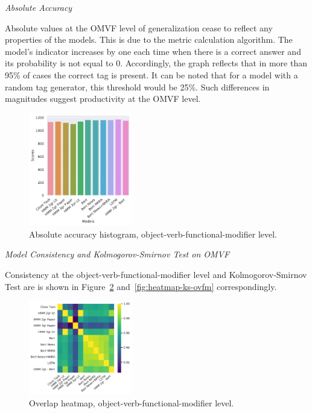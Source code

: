 \documentclass[a4paper]{article}
\newcommand{\head}[1]{\vspace{0.5em}\emph{#1}\vspace{0.25em}}
\begin{document}
\head{Absolute Accuracy}

Absolute values at the OMVF level of generalization cease to reflect
any properties of the models. This is due to the metric calculation
algorithm. The model's indicator increases by one each time when there
is a correct answer and its probability is not equal to 0.
Accordingly, the graph reflects that in more than 95\% of cases the
correct tag is present. It can be noted that for a model with a random
tag generator, this threshold would be 25\%. Such differences in magnitudes suggest productivity at the OMVF level. 

\begin{figure}
\caption{Absolute accuracy histogram, object-verb-functional-modifier level.}
\label{fig:abs-accuracy-hist-ovfm}
\centering
\includegraphics[width=0.4\textwidth]{figures/pdf/abs-accuracy-hist-ovfm.pdf}
\end{figure}

\head{Model Consistency and Kolmogorov-Smirnov Test on OMVF}

Consistency at the object-verb-functional-modifier level  and Kolmogorov-Smirnov Test are is shown in Figure~\ref{fig:heatmap-context-accord-ovfm} and~\ref{fig:heatmap-ks-ovfm} correspondingly.

\begin{figure}
\label{fig:heatmap-context-accord-ovfm}
\caption{Overlap heatmap, object-verb-functional-modifier level.}
\centering
\includegraphics[width=0.4\textwidth]{figures/pdf/heatmap-context-accord-ovfm.pdf}
\end{figure}
\end{document}

